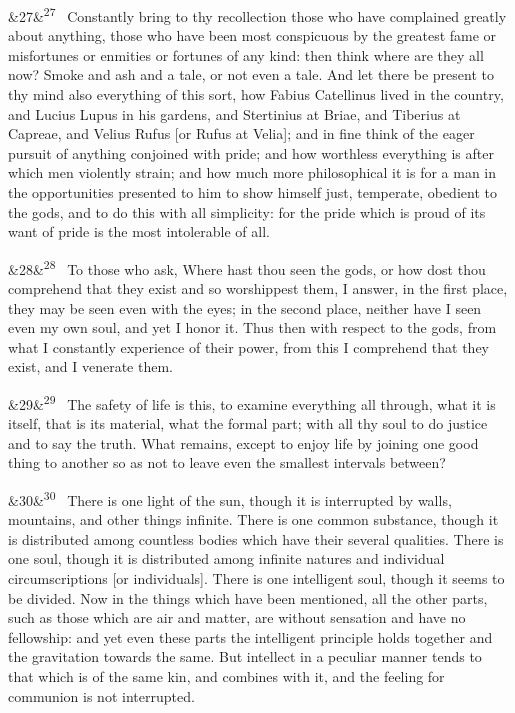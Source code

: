 \documentclass[12pt]{article}
\newcommand{\para}[1][]{\par\noindent\ifx&#1&\else\textsuperscript{\footnotesize #1}~\fi}
\begin{document}
\para[27] Constantly bring to thy recollection those who have complained
greatly about anything, those who have been most conspicuous by the
greatest fame or misfortunes or enmities or fortunes of any kind: then
think where are they all now? Smoke and ash and a tale, or not even a
tale. And let there be present to thy mind also everything of this sort,
how Fabius Catellinus lived in the country, and Lucius Lupus in his
gardens, and Stertinius at Briae, and Tiberius at Capreae, and Velius
Rufus [or Rufus at Velia]; and in fine think of the eager pursuit of
anything conjoined with pride; and how worthless everything is after
which men violently strain; and how much more philosophical it is for a
man in the opportunities presented to him to show himself just,
temperate, obedient to the gods, and to do this with all simplicity: for
the pride which is proud of its want of pride is the most intolerable of
all.

\para[28] To those who ask, Where hast thou seen the gods, or how dost thou
comprehend that they exist and so worshippest them, I answer, in the
first place, they may be seen even with the eyes; in the second
place, neither have I seen even my own soul, and yet I honor it. Thus
then with respect to the gods, from what I constantly experience of
their power, from this I comprehend that they exist, and I venerate
them.

\para[29] The safety of life is this, to examine everything all through, what
it is itself, that is its material, what the formal part; with all thy
soul to do justice and to say the truth. What remains, except to enjoy
life by joining one good thing to another so as not to leave even the
smallest intervals between?

\para[30] There is one light of the sun, though it is interrupted by walls,
mountains, and other things infinite. There is one common substance,
though it is distributed among countless bodies which have their several
qualities. There is one soul, though it is distributed among infinite
natures and individual circumscriptions [or individuals]. There is one
intelligent soul, though it seems to be divided. Now in the things which
have been mentioned, all the other parts, such as those which are air
and matter, are without sensation and have no fellowship: and yet even
these parts the intelligent principle holds together and the gravitation
towards the same. But intellect in a peculiar manner tends to that which
is of the same kin, and combines with it, and the feeling for communion
is not interrupted.
\end{document}
